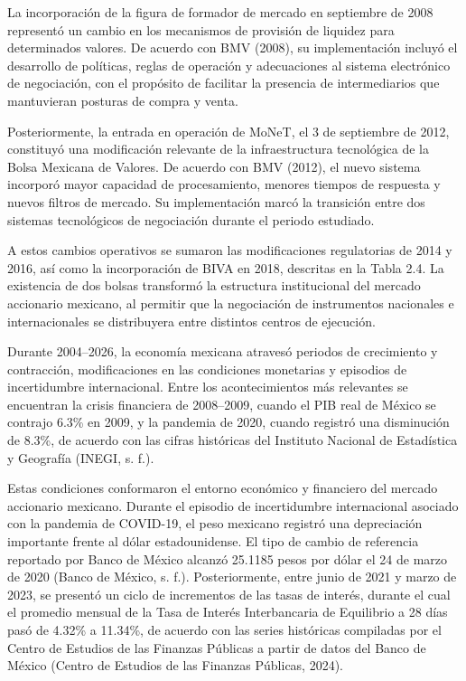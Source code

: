 La incorporación de la figura de formador de mercado en septiembre de 2008 representó un cambio en los mecanismos de provisión de liquidez para determinados valores. De acuerdo con BMV (2008), su implementación incluyó el desarrollo de políticas, reglas de operación y adecuaciones al sistema electrónico de negociación, con el propósito de facilitar la presencia de intermediarios que mantuvieran posturas de compra y venta.

Posteriormente, la entrada en operación de MoNeT, el 3 de septiembre de 2012, constituyó una modificación relevante de la infraestructura tecnológica de la Bolsa Mexicana de Valores. De acuerdo con BMV (2012), el nuevo sistema incorporó mayor capacidad de procesamiento, menores tiempos de respuesta y nuevos filtros de mercado. Su implementación marcó la transición entre dos sistemas tecnológicos de negociación durante el periodo estudiado.

A estos cambios operativos se sumaron las modificaciones regulatorias de 2014 y 2016, así como la incorporación de BIVA en 2018, descritas en la Tabla 2.4. La existencia de dos bolsas transformó la estructura institucional del mercado accionario mexicano, al permitir que la negociación de instrumentos nacionales e internacionales se distribuyera entre distintos centros de ejecución.


Durante 2004--2026, la economía mexicana atravesó periodos de crecimiento y contracción, modificaciones en las condiciones monetarias y episodios de incertidumbre internacional. Entre los acontecimientos más relevantes se encuentran la crisis financiera de 2008--2009, cuando el PIB real de México se contrajo 6.3\% en 2009, y la pandemia de 2020, cuando registró una disminución de 8.3\%, de acuerdo con las cifras históricas del Instituto Nacional de Estadística y Geografía (INEGI, s. f.).

Estas condiciones conformaron el entorno económico y financiero del mercado accionario mexicano. Durante el episodio de incertidumbre internacional asociado con la pandemia de COVID-19, el peso mexicano registró una depreciación importante frente al dólar estadounidense. El tipo de cambio de referencia reportado por Banco de México alcanzó 25.1185 pesos por dólar el 24 de marzo de 2020 (Banco de México, s. f.). Posteriormente, entre junio de 2021 y marzo de 2023, se presentó un ciclo de incrementos de las tasas de interés, durante el cual el promedio mensual de la Tasa de Interés Interbancaria de Equilibrio a 28 días pasó de 4.32\% a 11.34\%, de acuerdo con las series históricas compiladas por el Centro de Estudios de las Finanzas Públicas a partir de datos del Banco de México (Centro de Estudios de las Finanzas Públicas, 2024).

